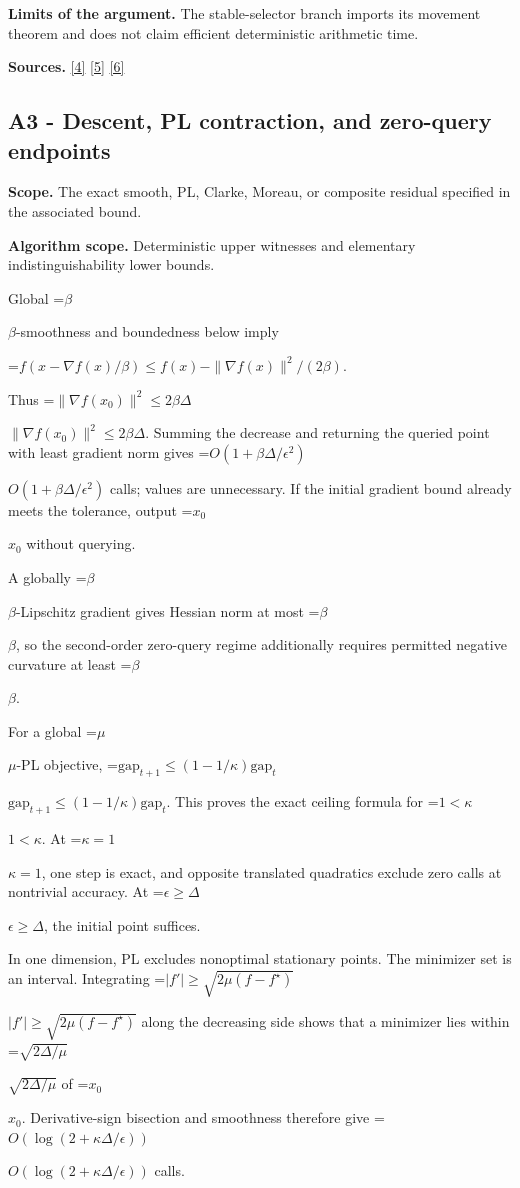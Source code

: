 \documentclass[10pt,a4paper]{article}
\newcommand{\AtlasMath}[1]{\par\begingroup\centering\setbox0=\hbox{$\displaystyle #1$}\ifdim\wd0>1.4\linewidth\typeout{ATLAS WIDE FORMULA: \the\wd0}\fi\ifdim\wd0>\linewidth\resizebox{\linewidth}{!}{\box0}\else\box0\fi\par\endgroup}
\newcommand{\AtlasInlineMath}[1]{\begingroup\setbox0=\hbox{$#1$}\ifdim\wd0>.4\linewidth\endgroup\AtlasMath{#1}\else\endgroup$#1$\fi}
\begin{document}
\textbf{Limits of the argument.} The stable-selector branch imports its movement theorem and does not claim efficient deterministic arithmetic time.

\textbf{Sources.} \href{https://arxiv.org/pdf/1405.4980}{[4]} \href{https://www2.isye.gatech.edu/~nemirovs/MOR_AccuracyCertificates.pdf}{[5]} \href{https://arxiv.org/pdf/2609.20701}{[6]}

\subsection{A3 - Descent, PL contraction, and zero-query endpoints}
\textbf{Scope.} The exact smooth, PL, Clarke, Moreau, or composite residual specified in the associated bound.

\textbf{Algorithm scope.} Deterministic upper witnesses and elementary indistinguishability lower bounds.

Global \AtlasInlineMath{\beta}-smoothness and boundedness below imply

\AtlasMath{f(x-\nabla f(x)/\beta)\le f(x)-\|\nabla f(x)\|^2/(2\beta).}

Thus \AtlasInlineMath{\|\nabla f(x_0)\|^2\le2\beta\Delta}. Summing the decrease and returning the queried point with least gradient norm gives \AtlasInlineMath{O(1+\beta\Delta/\epsilon^2)} calls; values are unnecessary. If the initial gradient bound already meets the tolerance, output \AtlasInlineMath{x_0} without querying.

A globally \AtlasInlineMath{\beta}-Lipschitz gradient gives Hessian norm at most \AtlasInlineMath{\beta}, so the second-order zero-query regime additionally requires permitted negative curvature at least \AtlasInlineMath{\beta}.

For a global \AtlasInlineMath{\mu}-PL objective,
\AtlasInlineMath{\mathrm{gap}_{t+1}\le(1-1/\kappa)\mathrm{gap}_t}.
This proves the exact ceiling formula for \AtlasInlineMath{1<\kappa}. At \AtlasInlineMath{\kappa=1}, one step is exact, and opposite translated quadratics exclude zero calls at nontrivial accuracy. At \AtlasInlineMath{\epsilon\ge\Delta}, the initial point suffices.

In one dimension, PL excludes nonoptimal stationary points. The minimizer set is an interval. Integrating
\AtlasInlineMath{|f'|\ge\sqrt{2\mu(f-f^\star)}}
along the decreasing side shows that a minimizer lies within \AtlasInlineMath{\sqrt{2\Delta/\mu}} of \AtlasInlineMath{x_0}. Derivative-sign bisection and smoothness therefore give \AtlasInlineMath{O(\log(2+\kappa\Delta/\epsilon))} calls.
\end{document}
